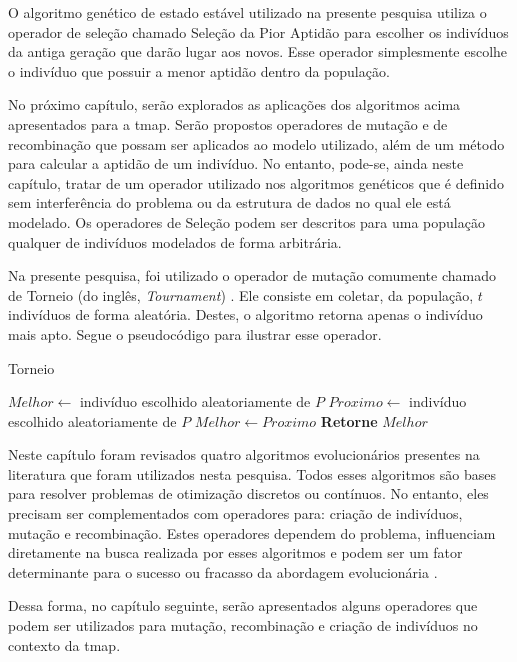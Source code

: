 O algoritmo genético de estado estável utilizado na presente pesquisa utiliza 
o operador de seleção chamado Seleção da Pior Aptidão 
\citep{Luke2013Metaheuristics} para escolher os indivíduos da antiga geração 
que darão lugar aos novos. Esse operador simplesmente escolhe o indivíduo que 
possuir a menor aptidão dentro da população.

No próximo capítulo, serão explorados as aplicações dos algoritmos acima 
apresentados para a \ac{tmap}. Serão propostos operadores de mutação e de 
recombinação que possam ser aplicados ao modelo utilizado, além de um método 
para calcular a aptidão de um indivíduo. No entanto, pode-se, ainda neste 
capítulo, tratar de um operador utilizado nos algoritmos genéticos que é 
definido sem interferência do problema ou da estrutura de dados no qual ele 
está modelado. Os operadores de Seleção podem ser descritos para uma população 
qualquer de indivíduos modelados de forma arbitrária.

Na presente pesquisa, foi utilizado o operador de mutação comumente chamado de 
Torneio (do inglês, \textit{Tournament}) \citep{Luke2013Metaheuristics}. Ele 
consiste em coletar, da população, $t$ indivíduos de forma aleatória. Destes, 
o algoritmo retorna apenas o indivíduo mais apto. Segue o pseudocódigo para 
ilustrar esse operador.

\begin{algorithm}[h]                      %
	\caption{Torneio}          %
	\label{torneio}                           %
	\begin{algorithmic}                    %
		\State $Melhor \gets $ indivíduo escolhido aleatoriamente de $P$ 
			\State $Proximo \gets $ indivíduo escolhido aleatoriamente de $P$
				\State $Melhor \gets Proximo$
			\EndIf
		\EndFor
		\State \textbf{Retorne} $Melhor$
		\EndProcedure
	\end{algorithmic}
\end{algorithm}

Neste capítulo foram revisados quatro algoritmos evolucionários presentes na 
literatura que foram utilizados nesta pesquisa. Todos esses algoritmos são bases 
para resolver problemas de otimização discretos ou contínuos. No entanto, eles 
precisam ser complementados com operadores para: criação de indivíduos, mutação 
e recombinação. Estes operadores dependem do problema, influenciam diretamente 
na busca realizada por esses algoritmos e podem ser um fator determinante para o 
sucesso ou fracasso da abordagem evolucionária \citep{Luke2013Metaheuristics}.

Dessa forma, no capítulo seguinte, serão apresentados alguns operadores que 
podem ser utilizados para mutação, recombinação e criação de indivíduos no 
contexto da \ac{tmap}.